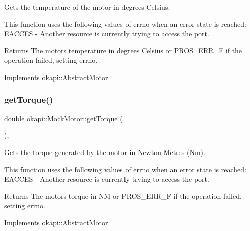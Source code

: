 Gets the temperature of the motor in degrees Celsius. 

This function uses the following values of errno when an error state is reached\+: E\+A\+C\+C\+ES -\/ Another resource is currently trying to access the port.

\begin{DoxyReturn}{Returns}
The motor\textquotesingle{}s temperature in degrees Celsius or P\+R\+O\+S\+\_\+\+E\+R\+R\+\_\+F if the operation failed, setting errno. 
\end{DoxyReturn}


Implements \mbox{\hyperlink{classokapi_1_1AbstractMotor_a96ef2dc7eeb1ac23713e3e37af9e95f2}{okapi\+::\+Abstract\+Motor}}.

\mbox{\label{classokapi_1_1MockMotor_a443e22ae0beef7ecb57ad73d13a36f9b}} 
\subsubsection{\texorpdfstring{getTorque()}{getTorque()}}
{\footnotesize\ttfamily double okapi\+::\+Mock\+Motor\+::get\+Torque (\begin{DoxyParamCaption}{ }\end{DoxyParamCaption})\hspace{0.3cm}{\ttfamily [override]}, {\ttfamily [virtual]}}



Gets the torque generated by the motor in Newton Metres (Nm). 

This function uses the following values of errno when an error state is reached\+: E\+A\+C\+C\+ES -\/ Another resource is currently trying to access the port.

\begin{DoxyReturn}{Returns}
The motor\textquotesingle{}s torque in NM or P\+R\+O\+S\+\_\+\+E\+R\+R\+\_\+F if the operation failed, setting errno. 
\end{DoxyReturn}


Implements \mbox{\hyperlink{classokapi_1_1AbstractMotor_a955818baa689b279b36dda6a74f15d4e}{okapi\+::\+Abstract\+Motor}}.

\mbox{\label{classokapi_1_1MockMotor_a9ae99f669a1d8c4de97205a155f69b6b}} 
